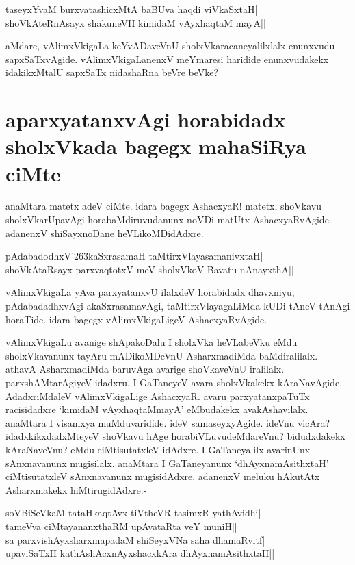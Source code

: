 \begin{shloka} 
taseyxYvaM burxvatashicxMtA baBUva haqdi viVkaSxtaH|\label{201a}\\ 
shoVkAteRnAsayx shakuneVH kimidaM vAyxhaqtaM mayA||
\end{shloka}

aMdare, vAlimxVkigaLa keYvADaveVnU sholxVkaracaneyalilxlalx enunxvudu sapxSaTxvAgide. vAlimxVkigaLanenxV meYmaresi haridide enunxvudakekx idakikxMtalU sapxSaTx nidashaRna beVre beVke? 

\section*{aparxyatanxvAgi horabidadx sholxVkada bagegx mahaSiRya ciMte} 

anaMtara matetx adeV ciMte. idara bagegx AshacxyaR! matetx, shoVkavu sholxVkarUpavAgi horabaMdiruvudanunx noVDi matUtx AshacxyaRvAgide. adanenxV shiSayxnoDane heVLikoMDidAdxre. 

\begin{shloka}
pAdabadodhxV\char'263kaSxrasamaH taMtirxVlayasamanivxtaH|\label{201}\\ 
shoVkAtaRsayx parxvaqtotxV meV sholxVkoV Bavatu nAnayxthA||
\end{shloka}


vAlimxVkigaLa yAva parxyatanxvU ilalxdeV horabidadx dhavxniyu, pAdabadadhxvAgi akaSxrasamavAgi, taMtirxVlayagaLiMda kUDi tAneV tAnAgi horaTide. idara bagegx vAlimxVkigaLigeV AshacxyaRvAgide. 

vAlimxVkigaLu avanige shApakoDalu I sholxVka heVLabeVku eMdu sholxVkavanunx tayAru mADikoMDeVnU AsharxmadiMda baMdiralilalx. athavA AsharxmadiMda baruvAga avarige shoVkaveVnU iralilalx. parxshAMtarAgiyeV idadxru. I GaTaneyeV avara sholxVkakekx kAraNavAgide. AdadxriMdaleV vAlimxVkigaLige AshacxyaR. avaru parxyatanxpaTuTx racisidadxre `kimidaM vAyxhaqtaMmayA' eMbudakekx avakAshavilalx. anaMtara I visamxya muMduvaridide. ideV samaseyxyAgide. ideVnu vicAra? idadxkikxdadxMteyeV shoVkavu hAge horabiVLuvudeMdareVnu? bidudxdakekx kAraNaveVnu? eMdu ciMtisutatxleV idAdxre. I GaTaneyalilx avarinUnx sAnxnavanunx mugisilalx. anaMtara I GaTaneyanunx `dhAyxnamAsithxtaH' ciMtisutatxleV sAnxnavanunx mugisidAdxre. adanenxV meluku hAkutAtx Asharxmakekx hiMtirugidAdxre.- 

\begin{shloka}
soV\s BiSeVkaM tataHkaqtAvx tiVtheVR tasimxR yathAvidhi|\label{201c}\\ 
tameVva ciMtayananxthaRM upAvataRta veY muniH||\\ 
sa parxvishAyxsharxmapadaM shiSeyxVNa saha dhamaRvitf|\label{201b}\\ 
upaviSaTxH kathAshAcxnAyxshacxkAra dhAyxnamAsithxtaH||
\end{shloka}


